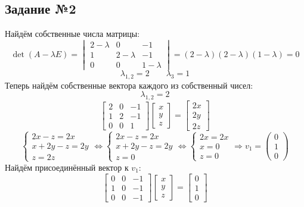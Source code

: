 \documentclass[a3paper,14pt]{extarticle}
\begin{document}
\subsection*{\centering Задание №2}
Найдём собственные числа матрицы:
$$\det(A-\lambda E) = \begin{vmatrix}
    2-\lambda & 0 & -1 \\ 1 & 2-\lambda & -1 \\ 0 & 0 & 1-\lambda
\end{vmatrix} = (2-\lambda)(2-\lambda)(1-\lambda)=0$$
$$\lambda_{1,2} = 2 \qquad \lambda_3 = 1$$
Теперь найдём собственные вектора каждого из собственный чисел:
$$\lambda_{1,2} = 2$$
$$\begin{bmatrix}
    2 & 0 & -1 \\ 1 & 2 & -1 \\ 0 & 0 & 1
\end{bmatrix}\begin{bmatrix}
    x \\ y \\ z
\end{bmatrix} = \begin{bmatrix}
    2x \\ 2y \\ 2z
\end{bmatrix}$$
$$\begin{cases}
    2x-z=2x \\
    x+2y-z=2y \\
    z = 2z
\end{cases} \Leftrightarrow \begin{cases}
    2x-z=2x \\
    x+2y-z=2y \\
    z = 0
\end{cases} \Leftrightarrow \begin{cases}
    2x=2x \\
    x = 0 \\
    z = 0
\end{cases} \Rightarrow v_1 = \begin{pmatrix}
    0 \\ 1 \\ 0
\end{pmatrix}$$
Найдём присоединённый вектор к $v_1$:
$$\begin{bmatrix}
    0 & 0 & -1 \\ 1 & 0 & -1 \\ 0 & 0 & -1
\end{bmatrix}\begin{bmatrix}
    x \\ y \\ z
\end{bmatrix} = \begin{bmatrix}
    0 \\ 1 \\ 0
\end{bmatrix}$$
\end{document}
